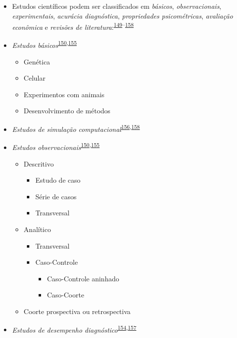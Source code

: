 \documentclass[
  a4paper,
]{book}
\begin{document}
\begin{itemize}
\item
  Estudos científicos podem ser classificados em \emph{básicos}, \emph{observacionais}, \emph{experimentais}, \emph{acurácia diagnóstica}, \emph{propriedades psicométricas}, \emph{avaliação econômica} e \emph{revisões de literatura}:\textsuperscript{\protect\hyperlink{ref-Grant2009}{149}--\protect\hyperlink{ref-chipman2022}{158}}
\item
  \emph{Estudos básicos}\textsuperscript{\protect\hyperlink{ref-Suxfct2014}{150},\protect\hyperlink{ref-Chidambaram2019}{155}}

  \begin{itemize}
  \item
    Genética
  \item
    Celular
  \item
    Experimentos com animais
  \item
    Desenvolvimento de métodos
  \end{itemize}
\item
  \emph{Estudos de simulação computacional}\textsuperscript{\protect\hyperlink{ref-Erdemir2020}{156},\protect\hyperlink{ref-chipman2022}{158}}
\item
  \emph{Estudos observacionais}\textsuperscript{\protect\hyperlink{ref-Suxfct2014}{150},\protect\hyperlink{ref-Chidambaram2019}{155}}

  \begin{itemize}
  \item
    Descritivo

    \begin{itemize}
    \item
      Estudo de caso
    \item
      Série de casos
    \item
      Transversal
    \end{itemize}
  \item
    Analítico

    \begin{itemize}
    \item
      Transversal
    \item
      Caso-Controle

      \begin{itemize}
      \item
        Caso-Controle aninhado
      \item
        Caso-Coorte
      \end{itemize}
    \end{itemize}
  \item
    Coorte prospectiva ou retrospectiva
  \end{itemize}
\item
  \emph{Estudos de desempenho diagnóstico}\textsuperscript{\protect\hyperlink{ref-Chassuxe92019}{154},\protect\hyperlink{ref-Yang2021}{157}}


\end{itemize}
\end{document}
